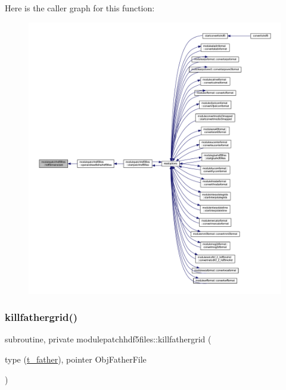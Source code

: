 Here is the caller graph for this function\+:\nopagebreak
\begin{figure}[H]
\begin{center}
\leavevmode
\includegraphics[width=350pt]{namespacemodulepatchhdf5files_ae7939a4a353ce44a104d18abfe71c0ef_icgraph}
\end{center}
\end{figure}
\mbox{\label{namespacemodulepatchhdf5files_a9cdefa24170268bd385859fedc04a136}} 
\subsubsection{\texorpdfstring{killfathergrid()}{killfathergrid()}}
{\footnotesize\ttfamily subroutine, private modulepatchhdf5files\+::killfathergrid (\begin{DoxyParamCaption}\item[{type (\mbox{\hyperlink{structmodulepatchhdf5files_1_1t__father}{t\+\_\+father}}), pointer}]{Obj\+Father\+File }\end{DoxyParamCaption})\hspace{0.3cm}{\ttfamily [private]}}

